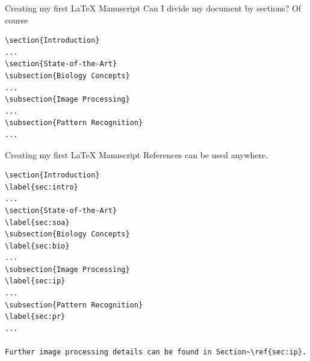 \begin{frame}[fragile]{Creating my first \LaTeX{} Manuscript}
Can I divide my document by sections? Of course
\footnotesize
\begin{verbatim}
\section{Introduction}
...
\section{State-of-the-Art}
\subsection{Biology Concepts}
...
\subsection{Image Processing}
...
\subsection{Pattern Recognition}
...
\end{verbatim}
\end{frame}

\begin{frame}[fragile]{Creating my first \LaTeX{} Manuscript}
References can be used anywhere. 
\scriptsize
\begin{verbatim}
\section{Introduction}
\label{sec:intro}
...
\section{State-of-the-Art}
\label{sec:soa}
\subsection{Biology Concepts}
\label{sec:bio}
...
\subsection{Image Processing}
\label{sec:ip}
...
\subsection{Pattern Recognition}
\label{sec:pr}
...

Further image processing details can be found in Section~\ref{sec:ip}.
\end{verbatim}
\end{frame}

